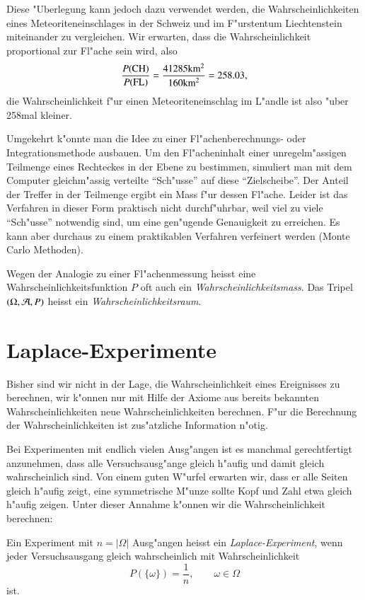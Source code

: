 Diese
"Uberlegung kann jedoch dazu verwendet werden, die Wahrscheinlichkeiten
eines Meteoriteneinschlages in der Schweiz und im F"urstentum Liechtenstein
miteinander zu vergleichen. Wir erwarten, dass die Wahrscheinlichkeit
proportional zur Fl"ache sein wird, also
\[
\frac{P(\text{CH})}{P(\text{FL})}=
\frac{41285\text{km$\mathstrut^2$}}{160\text{km$\mathstrut^2$}}
=258.03,
\]
die Wahrscheinlichkeit f"ur einen Meteoriteneinschlag im L"andle ist also
"uber 258mal kleiner.

Umgekehrt k"onnte man die Idee zu einer Fl"achenberechnungs- oder
Integra\-tions\-methode ausbauen. Um den Fl"acheninhalt einer unregelm"assigen
Teilmenge
eines Rechteckes in der Ebene zu bestimmen, simuliert man mit dem
Computer gleichm"assig verteilte ``Sch"usse'' auf diese ``Zielscheibe''.
Der Anteil der Treffer in der Teilmenge ergibt ein Mass f"ur dessen
Fl"ache. Leider ist das Verfahren in dieser Form praktisch nicht
durchf"uhrbar, weil viel zu viele ``Sch"usse'' notwendig sind, um
eine gen"ugende Genauigkeit zu erreichen. Es kann aber durchaus
zu einem praktikablen Verfahren verfeinert werden (Monte Carlo Methoden).

Wegen
der Analogie zu einer Fl"achenmessung heisst eine
Wahrscheinlichkeitsfunktion $P$ oft auch ein {\em Wahrscheinlichkeitsmass}. Das
Tripel $(\Omega,{\cal A}, P)$ heisst ein {\em Wahrscheinlichkeitsraum}.

\section{Laplace-Experimente} \label{section-laplace-ereignisse}
Bisher sind wir nicht in der Lage, die Wahrscheinlichkeit eines Ereignisses
zu berechnen, wir k"onnen nur mit Hilfe der Axiome aus bereits bekannten
Wahrscheinlichkeiten neue Wahrscheinlichkeiten berechnen.
F"ur die Berechnung der Wahrscheinlichkeiten ist zus"atzliche
Information n"otig.

Bei Experimenten mit endlich vielen Ausg"angen ist es manchmal gerechtfertigt
anzunehmen, dass alle Versuchsausg"ange gleich h"aufig und damit gleich
wahrscheinlich sind.
Von einem guten W"urfel erwarten wir, dass er alle Seiten gleich h"aufig
zeigt, eine symmetrische M"unze sollte Kopf und Zahl etwa gleich h"aufig
zeigen.
Unter dieser Annahme k"onnen wir die Wahrscheinlichkeit berechnen:

\begin{definition}
Ein Experiment mit $n=|\Omega|$ Ausg"angen heisst ein {\em Laplace-Experiment},
wenn jeder Versuchsausgang gleich wahrscheinlich mit Wahrscheinlichkeit
\[
P(\{\omega\})=\frac1n,\qquad\omega\in\Omega
\]
ist.
\end{definition}

